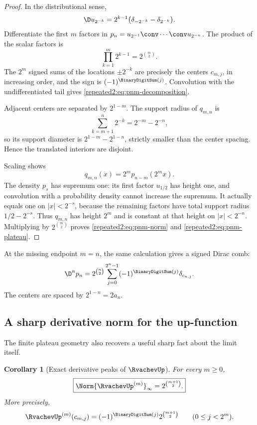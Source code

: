 \documentclass[11pt,oneside]{article}
\newtheorem{corollary}[corollary]{Corollary}
\theoremstyle{definition}
\theoremstyle{remark}
\begin{document}
\begin{proof}
In the distributional sense,
\begin{equation}
 \D u_{2^{-k}}=2^{k-1}\bigl(\delta_{-2^{-k}}-\delta_{2^{-k}}\bigr).
 \label{repeated2:eq:uniform-derivative-delta}
\end{equation}
Differentiate the first $m$ factors in
$p_n=u_{2^{-1}}\conv\cdots\conv u_{2^{-n}}$.  The product of the scalar factors is
\[
 \prod_{k=1}^{m}2^{k-1}=2^{\binom m2}.
\]
The $2^m$ signed sums of the locations $\pm2^{-k}$ are precisely the centers
$c_{m,j}$, in increasing order, and the sign is $(-1)^{\BinaryDigitSum(j)}$.  Convolution with the
undifferentiated tail gives \eqref{repeated2:eq:pnm-decomposition}.

Adjacent centers are separated by $2^{1-m}$.  The support radius of $q_{m,n}$ is
\[
 \sum_{k=m+1}^{n}2^{-k}=2^{-m}-2^{-n},
\]
so its support diameter is $2^{1-m}-2^{1-n}$, strictly smaller than the center spacing.
Hence the translated interiors are disjoint.

Scaling shows
\begin{equation}
 q_{m,n}(x)=2^m p_{n-m}(2^mx).
 \label{repeated2:eq:qmn-scaling}
\end{equation}
The density $p_s$ has supremum one: its first factor $u_{1/2}$ has height one, and
convolution with a probability density cannot increase the supremum.  It actually equals
one on $|x|<2^{-s}$, because the remaining factors have total support radius
$1/2-2^{-s}$.  Thus $q_{m,n}$ has height $2^m$ and is constant at that height on
$|x|<2^{-n}$.  Multiplying by $2^{\binom m2}$ proves
\eqref{repeated2:eq:pnm-norm} and \eqref{repeated2:eq:pnm-plateau}.
\end{proof}

At the missing endpoint $m=n$, the same calculation gives a signed Dirac comb:
\begin{equation}
 \D^np_n=2^{\binom n2}
 \sum_{j=0}^{2^n-1}(-1)^{\BinaryDigitSum(j)}\delta_{c_{n,j}}.
 \label{repeated2:eq:pn-top-delta-comb}
\end{equation}
The centers are spaced by $2^{1-n}=2a_n$.

\subsection{A sharp derivative norm for the up-function}

The finite plateau geometry also recovers a useful sharp fact about the limit itself.

\begin{corollary}[Exact derivative peaks of $\RvachevUp$]
\label{repeated2:cor:up-derivative-norm}
For every $m\ge0$,
\begin{equation}
 \boxed{\displaystyle
 \Norm{\RvachevUp^{(m)}}_\infty=2^{\binom{m+1}{2}}.}
 \label{repeated2:eq:up-derivative-norm}
\end{equation}
More precisely,
\begin{equation}
 \RvachevUp^{(m)}(c_{m,j})=(-1)^{\BinaryDigitSum(j)}2^{\binom{m+1}{2}}
 \qquad(0\le j<2^m).
 \label{repeated2:eq:up-derivative-peaks}
\end{equation}
\end{corollary}
\end{document}
